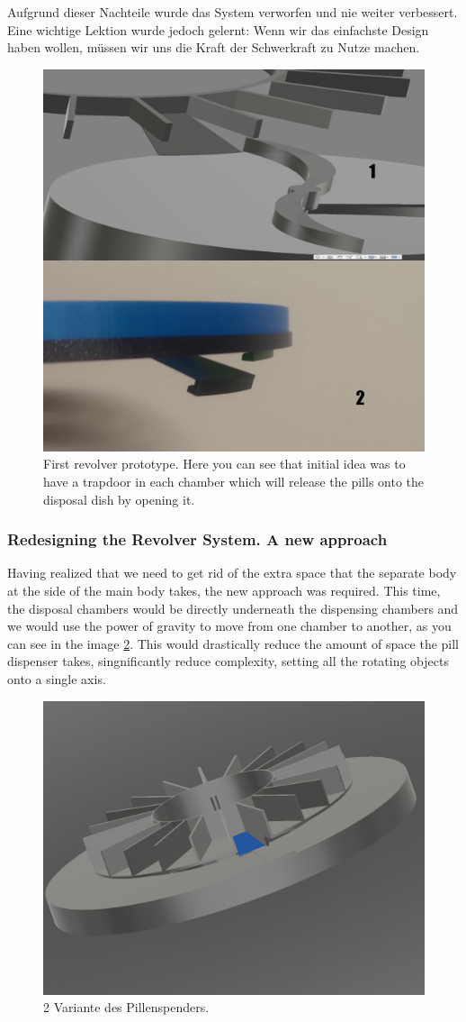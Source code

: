 Aufgrund dieser Nachteile wurde das System verworfen und nie weiter verbessert. Eine wichtige Lektion wurde jedoch gelernt: Wenn wir das einfachste Design haben wollen, müssen wir uns die Kraft der Schwerkraft zu Nutze machen.
\begin{figure}[h]
	\centering
	\includegraphics[width=0.7\linewidth]{Figures/Untitled-2}
	\caption[First revolver prototype]{First revolver prototype. Here you can see that initial idea was to have a trapdoor in each chamber which will release the pills onto the disposal dish by opening it.}
	\label{fig:screenshot1}
\end{figure}
\newpage
\subsubsection{Redesigning the Revolver System. A new approach}
Having realized that we need to get rid of the extra space that the separate body at the side of the main body takes, the new approach was required. This time, the disposal chambers would be directly underneath the dispensing chambers and we would use the power of gravity to move from one chamber to another, as you can see in the image \ref{fig:pspd2}. This would drastically reduce the amount of space the pill dispenser takes, singnificantly reduce complexity, setting all the rotating objects onto a single axis.


\begin{figure}[h]
	\centering
	\includegraphics[width=0.7\linewidth]{Figures/PSPD2}
	\caption[2 Variante des Pillenspenders.]{2 Variante des Pillenspenders.}
	\label{fig:pspd2}
\end{figure}

